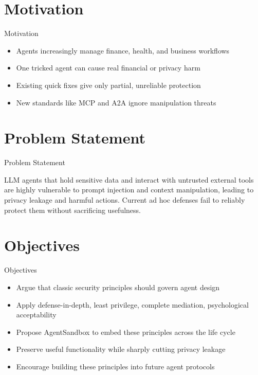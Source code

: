 \documentclass[10pt]{beamer}
\begin{document}
\section{Motivation}
\begin{frame}{Motivation}
\begin{itemize}
  \item Agents increasingly manage finance, health, and business workflows
  \item One tricked agent can cause real financial or privacy harm
  \item Existing quick fixes give only partial, unreliable protection
  \item New standards like MCP and A2A ignore manipulation threats
\end{itemize}
\end{frame}

\section{Problem Statement}
\begin{frame}{Problem Statement}
  \begin{block}{}
  LLM agents that hold sensitive data and interact with untrusted external tools are highly vulnerable to prompt injection and context manipulation, leading to privacy leakage and harmful actions. Current ad hoc defenses fail to reliably protect them without sacrificing usefulness.
  \end{block}
\end{frame}

\section{Objectives}
\begin{frame}{Objectives}
\begin{itemize}
  \item Argue that classic security principles should govern agent design
  \item Apply defense-in-depth, least privilege, complete mediation, psychological acceptability
  \item Propose AgentSandbox to embed these principles across the life cycle
  \item Preserve useful functionality while sharply cutting privacy leakage
  \item Encourage building these principles into future agent protocols
\end{itemize}
\end{frame}
\end{document}
